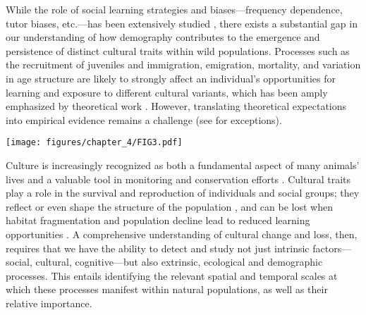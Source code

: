 While the role of social learning strategies and biases---frequency dependence, tutor biases, etc.---has been extensively studied \parencite{pike2010, kendal2015, aplin2017, lachlan2018, tchernichovski2021}, there exists a substantial gap in our understanding of how demography contributes to the emergence and persistence of distinct cultural traits within wild populations. Processes such as the recruitment of juveniles and immigration, emigration, mortality, and variation in age structure are likely to strongly affect an individual's opportunities for learning and exposure to different cultural variants, which has been amply emphasized by theoretical work \parencite{deffner2022a, deffner2022, kandler2023, fogarty2019, deffner2020, derex2016, kirby2021, nunn2009, barta2023, dyble2024, chimento2024}. However, translating theoretical expectations into empirical evidence remains a challenge (see \cite{chimento2021, fayet2014, payne1993} for exceptions).

\begin{figure*}[bh!]
    \centering
    \texttt{[image: figures/chapter\_4/FIG3.pdf]}
    \label{c4_fig:diversity}
\end{figure*}

Culture is increasingly recognized as both a fundamental aspect of many animals' lives and a valuable tool in monitoring and conservation efforts \parencite{brakes2019, brakes2021}. Cultural traits play a role in the survival and reproduction of individuals and social groups; they reflect or even shape the structure of the population \parencite{brakes2019}, and can be lost when habitat fragmentation and population decline lead to reduced learning opportunities \parencite{paxton2019, crates2021}. A comprehensive understanding of cultural change and loss, then, requires that we have the ability to detect and study not just intrinsic factors---social, cultural, cognitive---but also extrinsic, ecological and demographic processes. This entails identifying the relevant spatial and temporal scales at which these processes manifest within natural populations, as well as their relative importance. 

